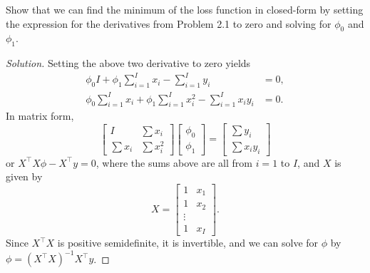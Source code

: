 \documentclass[10pt]{article}
\begin{document}
Show that we can find the minimum of the loss function in closed-form by setting the expression for the derivatives from Problem 2.1 to zero and solving for $\phi_0$ and $\phi_1$.

\begin{proof}[Solution]
    Setting the above two derivative to zero yields
    \begin{align*}
        \phi_0 I + \phi_1 \sum_{i=1}^I{x_i} - \sum_{i=1}^I{y_i} &= 0, \\
        \phi_0 \sum_{i=1}^I{x_i} + \phi_1 \sum_{i=1}^I{x_i^2} - \sum_{i=1}^I{x_iy_i} &= 0. 
    \end{align*}
    In matrix form, 
    \begin{equation*}
        \begin{bmatrix}
            I & \sum{x_i} \\
            \sum{x_i} & \sum{x_i^2}
        \end{bmatrix}
        \begin{bmatrix}
            \phi_0 \\
            \phi_1
        \end{bmatrix} = 
        \begin{bmatrix}
            \sum{y_i}  \\
            \sum{x_i y_i}
        \end{bmatrix}
    \end{equation*}
    or \(X^\top X \phi - X^\top y = 0\), where the sums above are all from \(i=1\) to \(I\), and \(X\) is given by
    \begin{equation*}
        X = \begin{bmatrix}
            1 & x_1 \\
            1 & x_2 \\
            \vdots \\
            1 & x_I
        \end{bmatrix}. 
    \end{equation*}
    Since \(X^\top X\) is positive semidefinite, it is invertible, and we can solve for \(\phi\) by \(\phi = (X^\top X)^{-1} X^\top y\). 
\end{proof}
\end{document}
